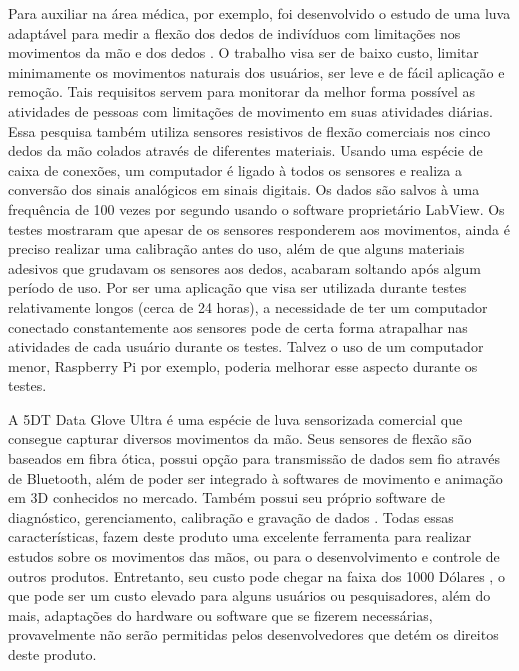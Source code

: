\documentclass[
	12pt,				%
	openright,			%
	oneside,			%
	a4paper,			%
	english,			%
	brazil				%
	]{abntex2}
\begin{document}
		Para auxiliar na área médica, por exemplo, foi desenvolvido o estudo de uma luva adaptável para medir a flexão dos dedos de indivíduos com limitações nos movimentos da mão e dos dedos \cite{simone2004lowcost}. O trabalho visa ser de baixo custo, limitar minimamente os movimentos naturais dos usuários, ser leve e de fácil aplicação e remoção. Tais requisitos servem para monitorar da melhor forma possível as atividades de pessoas com limitações de movimento em suas atividades diárias. Essa pesquisa também utiliza sensores resistivos de flexão comerciais nos cinco dedos da mão colados através de diferentes materiais. Usando uma espécie de caixa de conexões, um computador é ligado à todos os sensores e realiza a conversão dos sinais analógicos em sinais digitais. Os dados são salvos à uma frequência de 100 vezes por segundo usando o software proprietário LabView. Os testes mostraram que apesar de os sensores responderem aos movimentos, ainda é preciso realizar uma calibração antes do uso, além de que alguns materiais adesivos que grudavam os sensores aos dedos, acabaram soltando após algum período de uso. Por ser uma aplicação que visa ser utilizada durante testes relativamente longos (cerca de 24 horas), a necessidade de ter um computador conectado constantemente aos sensores pode de certa forma atrapalhar nas atividades de cada usuário durante os testes. Talvez o uso de um computador menor, Raspberry Pi por exemplo, poderia melhorar esse aspecto durante os testes.

		A 5DT Data Glove Ultra é uma espécie de luva sensorizada comercial que consegue capturar diversos movimentos da mão. Seus sensores de flexão são baseados em fibra ótica, possui opção para transmissão de dados sem fio através de Bluetooth, além de poder ser integrado à softwares de movimento e animação em 3D conhecidos no mercado. Também possui seu próprio software de diagnóstico, gerenciamento, calibração e gravação de dados \cite{5DT-ultra}. Todas essas características, fazem deste produto uma excelente ferramenta para realizar estudos sobre os movimentos das mãos, ou para o desenvolvimento e controle de outros produtos. Entretanto, seu custo pode chegar na faixa dos 1000 Dólares \cite{5DT-glove2019ebay}, o que pode ser um custo elevado para alguns usuários ou pesquisadores, além do mais, adaptações do hardware ou software que se fizerem necessárias, provavelmente não serão permitidas pelos desenvolvedores que detém os direitos deste produto.



\end{document}
